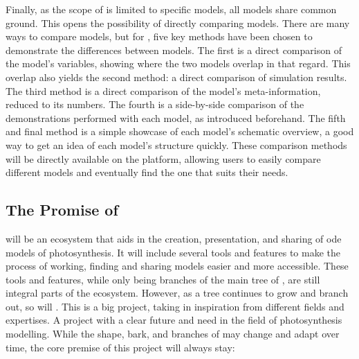Finally, as the scope of \greensloth{} is limited to specific models, all models share common ground. This opens the possibility of directly comparing models. There are many ways to compare models, but for \greensloth{}, 
five key methods have been chosen to demonstrate the differences between models. The first is a direct comparison of the model's variables, showing where the two models overlap in that regard. This overlap also yields the second method: a direct comparison of simulation results. The third method is a direct comparison of the model's meta-information, reduced to its numbers. The fourth is a side-by-side comparison of the demonstrations performed with each model, as introduced beforehand. The fifth and final method is a simple showcase of each model's schematic overview, a good way to get an idea of each model's structure quickly. These comparison methods will be directly available on the \greensloth{} platform, allowing users to easily compare different models and eventually find the one that suits their needs.

\subsection{The Promise of \greensloth{}}

\greensloth{} will be an ecosystem that aids in the creation, presentation, and sharing of \gls{ode} models of photosynthesis. It will include several tools and features to make the process of working, finding and sharing models easier and more accessible. These tools and features, while only being branches of the main tree of \greensloth{}, are still integral parts of the ecosystem. However, as a tree continues to grow and branch out, so will \greensloth{}. This is a big project, taking in inspiration from different fields and expertises. A project with a clear future and need in the field of photosynthesis modelling. While the shape, bark, and branches of \greensloth{} may change and adapt over time, the core premise of this project will always stay:

\begin{center}
    \Large
\end{center}